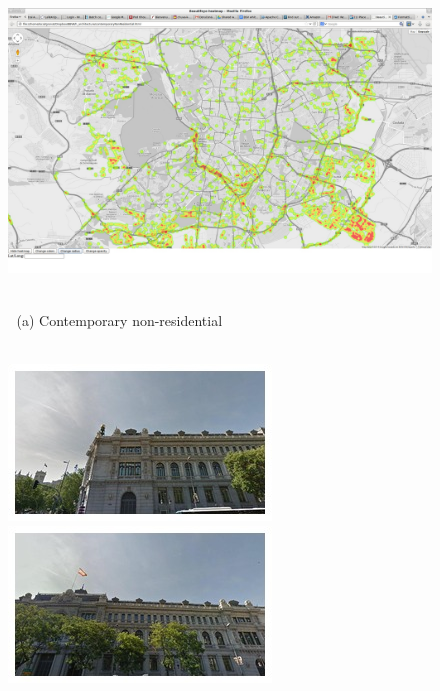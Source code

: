 \begin{figure}[t]
\begin{minipage}{\linewidth}
\begin{minipage}{0.3\linewidth}
    \end{minipage}
    \begin{minipage}{0.7\linewidth}
      \includegraphics[trim= 350 150 250 150, clip=true, width=\linewidth]{imgs/arch/mapS4.jpg}
    \end{minipage}
  \end{minipage}
  \\
  $\;$ \hspace{30mm} (a) Contemporary non-residential
  \\
  \\
  \begin{minipage}{\linewidth}
    \begin{minipage}{0.3\linewidth}
      \includegraphics[width=0.49\linewidth]{imgs/arch/mosaicsS1/mosaic0000.jpg}
      \includegraphics[width=0.49\linewidth]{imgs/arch/mosaicsS1/mosaic0001.jpg}
      \\ \vspace{-3mm} \\

\end{minipage}
\end{minipage}
\end{figure}
